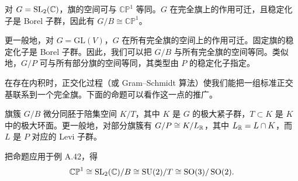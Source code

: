 
\begin{example}[A.42] 对 $G=\operatorname{SL}_2(\mathbb{C})$，旗的空间可与 $\mathbb{CP}^1$ 等同。$G$ 在完全旗上的作用可迁，且稳定化子是 Borel 子群，因此有 $G/B\cong\mathbb{CP}^1$。
\end{example}

更一般地，对 $G=\mathrm{GL}(V)$，$G$ 在所有完全旗的空间上的作用可迁。固定旗的稳定化子是 Borel 子群。因此，我们可以把 $G/B$ 与所有完全旗的空间等同。类似地，$G/P$ 可与所有部分旗的空间等同，其类型由 $P$ 的稳定化子指定。

在存在内积时，正交化过程（或 Gram–Schmidt 算法）使我们能把一组标准正交基联系到一个完全旗。下面的命题可以看作这一点的推广。

\begin{proposition}[A.43] 旗簇 $G/B$ 微分同胚于陪集空间 $K/T$，其中 $K$ 是 $G$ 的极大紧子群，$T\subset K$ 是 $K$ 中的极大环面。更一般地，对部分旗簇有 $G/P\cong K/L_{\mathbb{R}}$，其中 $L_{\mathbb{R}}=L\cap K$，而 $L$ 是 $P$ 对应的 Levi 子群。
\end{proposition}

\begin{example}[A.44] 把命题应用于例 A.42，得
\[
\mathbb{CP}^1\cong\operatorname{SL}_2(\mathbb{C})/B\cong\operatorname{SU}(2)/T\cong\operatorname{SO}(3)/\operatorname{SO}(2).
\]
\end{example}




